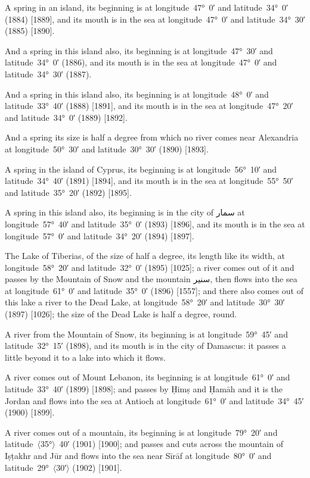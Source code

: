 \documentclass[11pt]{article}
\newcommand{\Pg}[1]{\marginpar{\footnotesize #1}}
\newcommand{\Ang}[1]{\ensuremath{#1}}
\begin{document}
A spring in an island, its beginning is at longitude~47°~0′ and latitude~34°~0′ (1884) [1889], and its mouth is in the sea at longitude~47°~0′ and latitude~34°~30′ (1885) [1890].

And a spring in this island also, its beginning is at longitude~47°~30′ and latitude~34°~0′ (1886), and its mouth is in the sea at longitude~47°~0′ and latitude~34°~30′ (1887).

And a spring in this island also, its beginning is at longitude~48°~0′ and latitude~33°~40′ (1888) [1891], and its mouth is in the sea at longitude~47°~20′ and latitude~34°~0′ (1889) [1892].

And a spring its size is half a degree from which no river comes near Alexandria at longitude~50°~30′ and latitude~30°~30′ (1890) [1893].

A spring in the island of Cyprus, its beginning is at longitude~56°~10′ and latitude~34°~40′ (1891) [1894], and its mouth is in the sea at longitude~55°~50′ and latitude~35°~20′ (1892) [1895].

A spring in this island also, its beginning is in the city of \textarabic{سمار} at longitude~57°~40′ and latitude~35°~0′ (1893) [1896]\Pg{p. 125}, and its mouth is in the sea at longitude~57°~0′ and latitude~34°~20′ (1894) [1897].

The Lake of Tiberias, of the size of half a degree, its length like its width, at longitude~58°~20′ and latitude~32°~0′ (1895) [1025]; a river comes out of it and passes by the Mountain of Snow and the mountain \textarabic{سنير}, then flows into the sea at longitude~61°~0′ and latitude~35°~0′ (1896) [1557]; and there also comes out of this lake a river to the Dead Lake, at longitude~58°~20′ and latitude~30°~30′ (1897) [1026]; the size of the Dead Lake is half a degree, round.

A river from the Mountain of Snow, its beginning is at longitude~59°~45′ and latitude~32°~15′ (1898), and its mouth is in the city of Damascus: it passes a little beyond it to a lake into which it flows.

A river comes out of Mount Lebanon, its beginning is at longitude~61°~0′ and latitude~33°~40′ (1899) [1898]; and passes by Ḥimṣ and Ḥamāh and it is the Jordan and flows into the sea at Antioch at longitude~61°~0′ and latitude~34°~45′ (1900) [1899].

A river comes out of a mountain, its beginning is at longitude~79°~20′ and latitude~\Ang{\langle}35°\Ang{\rangle}~40′ (1901) [1900]; and passes and cuts across the mountain of Iṣṭakhr and Jūr and flows into the sea near Sīrāf at longitude~80°~0′ and latitude~29°~\Ang{\langle}30′\Ang{\rangle} (1902) [1901].
\end{document}
